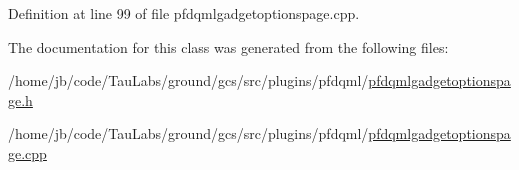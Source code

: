 \-Definition at line 99 of file pfdqmlgadgetoptionspage.\-cpp.



\-The documentation for this class was generated from the following files\-:\begin{DoxyCompactItemize}
\item 
/home/jb/code/\-Tau\-Labs/ground/gcs/src/plugins/pfdqml/\hyperlink{pfdqmlgadgetoptionspage_8h}{pfdqmlgadgetoptionspage.\-h}\item 
/home/jb/code/\-Tau\-Labs/ground/gcs/src/plugins/pfdqml/\hyperlink{pfdqmlgadgetoptionspage_8cpp}{pfdqmlgadgetoptionspage.\-cpp}\end{DoxyCompactItemize}
